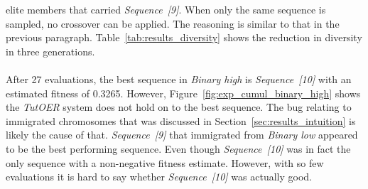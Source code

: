 elite members that carried \emph{Sequence~[9]}. When only the same sequence is
sampled, no crossover can be applied. The reasoning is similar to that in the
previous paragraph. Table~\ref{tab:results_diversity} shows the reduction in
diversity in three generations.\\\\
\noindent
After 27 evaluations, the best sequence in \emph{Binary high} is
\emph{Sequence~[10]} with an estimated fitness of 0.3265. However,
Figure~\ref{fig:exp_cumul_binary_high} shows the \emph{TutOER} system does
not hold on to the best sequence. The bug relating to immigrated chromosomes
that was discussed in Section~\ref{sec:results_intuition} is likely the cause
of that. \emph{Sequence~[9]} that immigrated from \emph{Binary low} appeared to
be the best performing sequence. Even though \emph{Sequence~[10]} was in fact
the only sequence with a non-negative fitness estimate. However, with so few
evaluations it is hard to say whether \emph{Sequence~[10]} was actually good.
